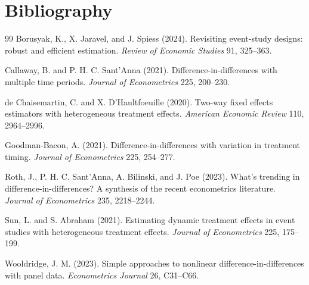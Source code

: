 \documentclass[11pt]{article}
\theoremstyle{definition}
\theoremstyle{plain}
\theoremstyle{remark}
\begin{document}
\section*{Bibliography}
\begin{thebibliography}{99}
Borusyak, K., X. Jaravel, and J. Spiess (2024). Revisiting event-study designs: robust and efficient estimation. \emph{Review of Economic Studies} 91, 325--363.

Callaway, B. and P. H. C. Sant'Anna (2021). Difference-in-differences with multiple time periods. \emph{Journal of Econometrics} 225, 200--230.

de Chaisemartin, C. and X. D'Haultfoeuille (2020). Two-way fixed effects estimators with heterogeneous treatment effects. \emph{American Economic Review} 110, 2964--2996.

Goodman-Bacon, A. (2021). Difference-in-differences with variation in treatment timing. \emph{Journal of Econometrics} 225, 254--277.

Roth, J., P. H. C. Sant'Anna, A. Bilinski, and J. Poe (2023). What's trending in difference-in-differences? A synthesis of the recent econometrics literature. \emph{Journal of Econometrics} 235, 2218--2244.

Sun, L. and S. Abraham (2021). Estimating dynamic treatment effects in event studies with heterogeneous treatment effects. \emph{Journal of Econometrics} 225, 175--199.

Wooldridge, J. M. (2023). Simple approaches to nonlinear difference-in-differences with panel data. \emph{Econometrics Journal} 26, C31--C66.
\end{thebibliography}
\end{document}
